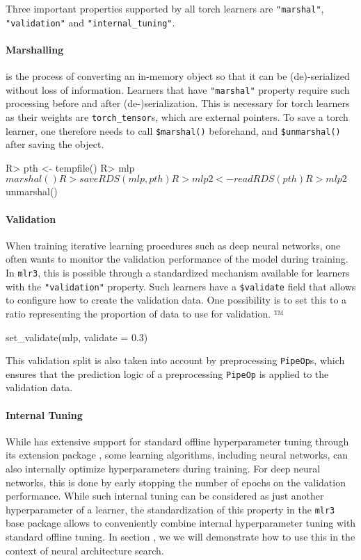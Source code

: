 \documentclass[article, nojss]{jss}
\theoremstyle{definition}
\begin{document}
Three important properties supported by all torch learners are \texttt{"marshal"}, \texttt{"validation"} and \texttt{"internal\_tuning"}.

\paragraph{Marshalling} is the process of converting an in-memory object so that it can be (de)-serialized without loss of information.
Learners that have \texttt{"marshal"} property require such processing before and after (de-)serialization.
This is necessary for torch learners as their weights are \texttt{torch\_tensor}s, which are external pointers.
To save a torch learner, one therefore needs to call \texttt{\$marshal()} beforehand, and \texttt{\$unmarshal()} after saving the object.

\begin{CodeInput}
R> pth <- tempfile()
R> mlp$marshal()
R> saveRDS(mlp, pth)
R> mlp2 <- readRDS(pth)
R> mlp2$unmarshal()
\end{CodeInput}

\paragraph{Validation}

When training iterative learning procedures such as deep neural networks, one often wants to monitor the validation performance of the model during training.
In \texttt{mlr3}, this is possible through a standardized mechanism available for learners with the \texttt{"validation"} property.
Such learners have a \texttt{\$validate} field that allows to configure how to create the validation data.
One possibility is to set this to a ratio representing the proportion of data to use for validation.
™
\begin{CodeInput}
set_validate(mlp, validate = 0.3)
\end{CodeInput}

This validation split is also taken into account by preprocessing \texttt{PipeOp}s, which ensures that the prediction logic of a preprocessing \texttt{PipeOp} is applied to the validation data.

\paragraph{Internal Tuning}

While  has extensive support for standard offline hyperparameter tuning through its extension package  \citep{ref-mlr3tuning}, some learning algorithms, including neural networks, can also internally optimize hyperparameters during training.
For deep neural networks, this is done by early stopping the number of epochs on the validation performance. 
While such internal tuning can be considered as just another hyperparameter of a learner, the standardization of this property in the \texttt{mlr3} base package allows to conveniently combine internal hyperparameter tuning with standard offline tuning.
In section , we we will demonstrate how to use this in the context of neural architecture search.
\end{document}
